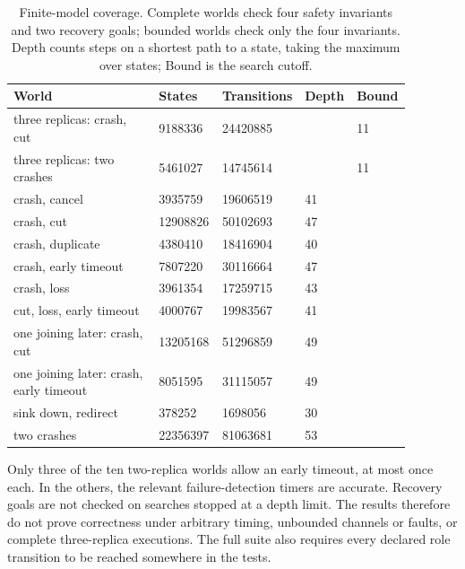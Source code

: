 \begin{table}[htbp]
\centering\small
\caption{Finite-model coverage. Complete worlds check four safety invariants and two recovery goals; bounded worlds check only the four invariants. Depth counts steps on a shortest path to a state, taking the maximum over states; Bound is the search cutoff.}
\label{tab:zombie-results}
\setlength{\tabcolsep}{3pt}
\begin{tabular}{p{0.42\linewidth}p{0.16\linewidth}p{0.16\linewidth}p{0.07\linewidth}p{0.07\linewidth}}
\toprule
World & States & Transitions & Depth & Bound \\
\midrule
three replicas: crash, cut & 9188336 & 24420885 &  & 11 \\
three replicas: two crashes & 5461027 & 14745614 &  & 11 \\
crash, cancel & 3935759 & 19606519 & 41 &  \\
crash, cut & 12908826 & 50102693 & 47 &  \\
crash, duplicate & 4380410 & 18416904 & 40 &  \\
crash, early timeout & 7807220 & 30116664 & 47 &  \\
crash, loss & 3961354 & 17259715 & 43 &  \\
cut, loss, early timeout & 4000767 & 19983567 & 41 &  \\
one joining later: crash, cut & 13205168 & 51296859 & 49 &  \\
one joining later: crash, early timeout & 8051595 & 31115057 & 49 &  \\
sink down, redirect & 378252 & 1698056 & 30 &  \\
two crashes & 22356397 & 81063681 & 53 &  \\
\bottomrule
\end{tabular}
\end{table}

Only three of the ten two-replica worlds allow an early timeout, at most
once each. In the others, the relevant failure-detection timers are
accurate. Recovery goals are not checked on searches stopped at a depth
limit. The results therefore do not prove correctness under arbitrary
timing, unbounded channels or faults, or complete three-replica
executions. The full suite also requires every declared role transition
to be reached somewhere in the tests.

